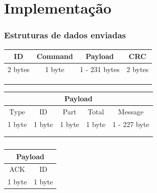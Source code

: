 \documentclass[12pt]{beamer}
\begin{document}
\section{Implementação}
\begin{frame}
    \frametitle{Estruturas de dados enviadas}
    \begin{table}[t]
        \centering
        \begin{tabular}{llll}
            \hline
            \multicolumn{1}{|c|}{ID}      & \multicolumn{1}{c|}{Command} & \multicolumn{1}{c|}{Payload}       & \multicolumn{1}{c|}{CRC}     \\ \hline
            \multicolumn{1}{|c|}{2 bytes} & \multicolumn{1}{c|}{1 byte}  & \multicolumn{1}{c|}{1 - 231 bytes} & \multicolumn{1}{c|}{2 bytes} \\ \hline
                                          &  &  &  \\
                                          &  &  &  \\
                                          &  &  &
        \end{tabular}
    \end{table}

    \begin{table}[h]
        \centering
        \begin{tabular}{cllll}
            \hline
            \multicolumn{5}{|c|}{Payload}    \\ \hline
            \multicolumn{1}{|c|}{Type}   & \multicolumn{1}{c|}{ID}     & \multicolumn{1}{c|}{Part}   & \multicolumn{1}{c|}{Total}  & \multicolumn{1}{c|}{Message}      \\ \hline
            \multicolumn{1}{|c|}{1 byte} & \multicolumn{1}{c|}{1 byte} & \multicolumn{1}{c|}{1 byte} & \multicolumn{1}{c|}{1 byte} & \multicolumn{1}{c|}{1 - 227 byte} \\ \hline
            \multicolumn{1}{l}{} &  &  &  &  \\
            \multicolumn{1}{l}{} &  &  &  &
        \end{tabular}
    \end{table}
    \begin{table}[t]
        \begin{tabular}{|cc|}
            \hline
            \multicolumn{2}{|c|}{Payload}         \\ \hline
            \multicolumn{1}{|c|}{ACK}    & ID     \\ \hline
            \multicolumn{1}{|c|}{1 byte} & 1 byte \\ \hline
        \end{tabular}
        \caption{}
        \label{tab:my-table}
    \end{table}
\end{frame}
\end{document}
